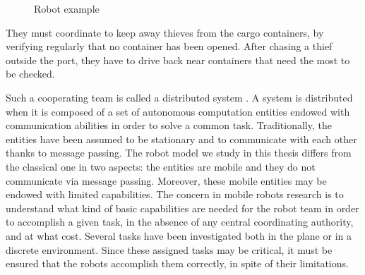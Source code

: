 \begin{figure}[h]
\caption{Robot example}
\label{fig:port}
\end{figure}
They must coordinate to keep away thieves from the cargo containers, by verifying regularly that no container has been opened. 
After chasing a thief outside the port, they have to drive back near containers that need the most to be checked.

Such a cooperating  team is called a distributed system \cite{Lynch96,Tel:2001:IDA:517021}. A system is distributed when it is composed of a set of autonomous computation entities endowed with communication abilities in order to solve a common task.
Traditionally, the entities have been assumed to be stationary and to communicate with each other thanks to message passing. 
The robot model we study in this thesis \cite{suzuki_distributed_1999,FPS12} differs from the classical one in two aspects: 
the entities are mobile and they do not communicate via message passing. Moreover, these mobile entities may be endowed with limited capabilities.
The concern in mobile robots research is to understand what kind of basic capabilities are needed for the robot team in order to accomplish a given task, in the absence of any central coordinating authority, and at what cost.
Several tasks have been investigated both in the plane or in a discrete environment.
Since these assigned tasks may be critical, it must be ensured that the robots accomplish them correctly, in spite of their limitations.

